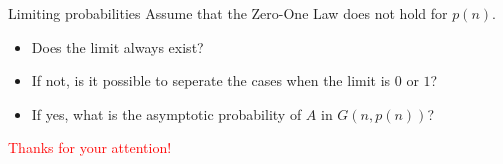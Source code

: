 \documentclass[handout]{beamer}
\renewcommand{\emph}[1]{\textcolor{red}{#1}}
\begin{document}
\begin{frame}{Limiting probabilities}
	Assume that the Zero-One Law does not hold for $p(n)$.

	\pause
	\begin{itemize}
		\item Does the limit always exist? \\ \only<4->{\emph{[NonConvergence]}}
		\item If not, is it possible to seperate the cases when the limit is $0$ or $1$? \only<3->{\emph{[NonSeperability]}}
		\item If yes, what is the asymptotic probability of $A$ in $G(n,p(n))$? 
	\end{itemize}

\end{frame}



\begin{frame}{}
	\begin{center}
		\LARGE{
		\emph{
		Thanks for your attention!
		}
		}
	\end{center}
\end{frame}
\end{document}
